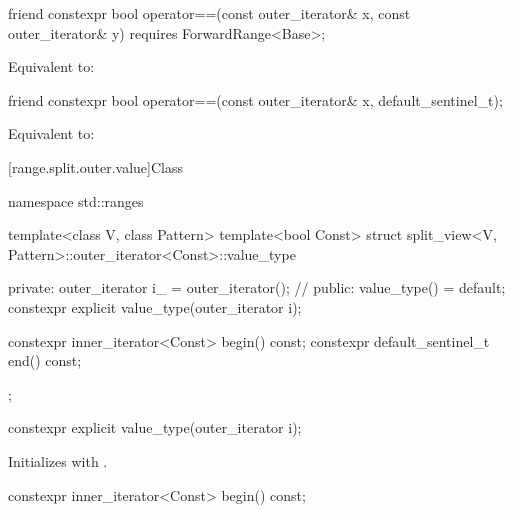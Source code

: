 %
\begin{itemdecl}
friend constexpr bool operator==(const outer_iterator& x, const outer_iterator& y)
  requires ForwardRange<Base>;
\end{itemdecl}

\begin{itemdescr}
\pnum
\effects Equivalent to: 
\end{itemdescr}

%
\begin{itemdecl}
friend constexpr bool operator==(const outer_iterator& x, default_sentinel_t);
\end{itemdecl}

\begin{itemdescr}
\pnum
\effects
Equivalent to: 
\end{itemdescr}

[range.split.outer.value]{Class }

\begin{codeblock}
namespace std::ranges {
  template<class V, class Pattern>
  template<bool Const>
  struct split_view<V, Pattern>::outer_iterator<Const>::value_type {
  private:
    outer_iterator i_ = outer_iterator();               // \expos
  public:
    value_type() = default;
    constexpr explicit value_type(outer_iterator i);

    constexpr inner_iterator<Const> begin() const;
    constexpr default_sentinel_t end() const;
  };
}
\end{codeblock}

%
\begin{itemdecl}
constexpr explicit value_type(outer_iterator i);
\end{itemdecl}

\begin{itemdescr}
\pnum
\effects Initializes  with .
\end{itemdescr}

%
\begin{itemdecl}
constexpr inner_iterator<Const> begin() const;
\end{itemdecl}

